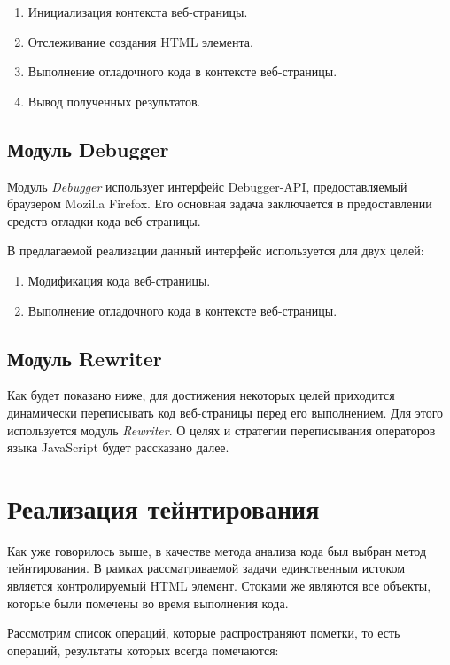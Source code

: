 	\begin{enumerate}
		\item Инициализация контекста веб-страницы.
		\item Отслеживание создания HTML элемента.
		\item Выполнение отладочного кода в контексте веб-страницы.
		\item Вывод полученных результатов.
	\end{enumerate}

\subsection{Модуль Debugger}
	Модуль \textit{Debugger} использует интерфейс Debugger-API, предоставляемый браузером Mozilla Firefox. Его основная задача заключается в предоставлении средств отладки кода веб-страницы.


	В предлагаемой реализации данный интерфейс используется для двух целей:


	\begin{enumerate}
		\item Модификация кода веб-страницы.
		\item Выполнение отладочного кода в контексте веб-страницы.
	\end{enumerate}

\subsection{Модуль Rewriter}
	Как будет показано ниже, для достижения некоторых целей приходится динамически переписывать код веб-страницы перед его выполнением. Для этого используется модуль \textit{Rewriter}. О целях и стратегии переписывания операторов языка JavaScript будет рассказано далее.

\section{Реализация тейнтирования}
Как уже говорилось выше, в качестве метода анализа кода был выбран метод тейнтирования. В рамках рассматриваемой задачи единственным истоком является контролируемый HTML элемент. Стоками же являются все объекты, которые были помечены во время выполнения кода.


Рассмотрим список операций, которые распространяют пометки, то есть операций, результаты которых всегда помечаются:



